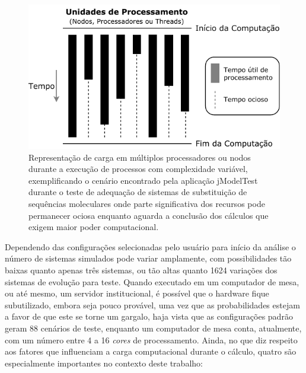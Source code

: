 \documentclass[english,brazilian]{UNISINOSmonografia} %
\newcommand\defaultFigureWidth{0.9}
\begin{document}
\begin{figure}[tb]
	\centering%
	\begin{minipage}{\defaultFigureWidth\textwidth}
		\caption{Representação de carga em múltiplos processadores ou nodos durante a execução de processos com complexidade variável, exemplificando o cenário encontrado pela aplicação jModelTest durante o teste de adequação de sistemas de substituição de sequências moleculares onde parte significativa dos recursos pode permanecer ociosa enquanto aguarda a conclusão dos cálculos que exigem maior poder computacional.}
		\label{fig:modelo-ociosidade}
		\centering
		\includegraphics{modelo-ociosidade}
	\end{minipage}
\end{figure}


Dependendo das configurações selecionadas pelo usuário para início da análise o número de sistemas simulados pode variar amplamente, com possibilidades tão baixas quanto apenas três sistemas, ou tão altas quanto 1624 variações dos sistemas de evolução para teste.
Quando executado em um computador de mesa, ou até mesmo, um servidor institucional, é possível que o hardware fique subutilizado, embora seja pouco provável, uma vez que as probabilidades estejam a favor de que este se torne um gargalo, haja vista que as configurações padrão geram 88 cenários de teste, enquanto um computador de mesa conta, atualmente, com um número entre 4 a 16 \textit{cores} de processamento.
Ainda, no que diz respeito aos fatores que influenciam a carga computacional durante o cálculo, quatro são especialmente importantes no contexto deste trabalho:
\end{document}
